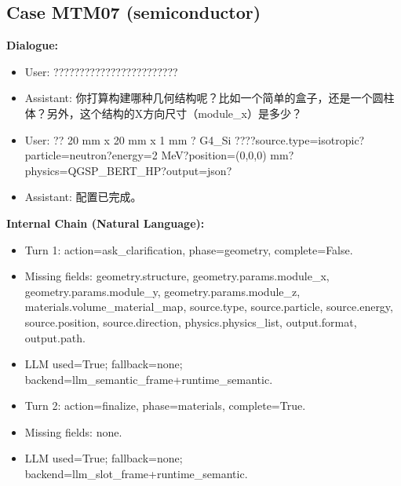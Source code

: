 \documentclass[11pt]{ctexart}
\begin{document}
\subsection{Case MTM07 (semiconductor)}
\textbf{Dialogue:}
\begin{itemize}
\item User: ????????????????????????
\item Assistant: 你打算构建哪种几何结构呢？比如一个简单的盒子，还是一个圆柱体？另外，这个结构的X方向尺寸（module\_x）是多少？
\item User: ?? 20 mm x 20 mm x 1 mm ? G4\_Si ????source.type=isotropic?particle=neutron?energy=2 MeV?position=(0,0,0) mm?physics=QGSP\_BERT\_HP?output=json?
\item Assistant: 配置已完成。
\end{itemize}
\textbf{Internal Chain (Natural Language):}
\begin{itemize}
\item Turn 1: action=ask\_clarification, phase=geometry, complete=False.
\item Missing fields: geometry.structure, geometry.params.module\_x, geometry.params.module\_y, geometry.params.module\_z, materials.volume\_material\_map, source.type, source.particle, source.energy, source.position, source.direction, physics.physics\_list, output.format, output.path.
\item LLM used=True; fallback=none; backend=llm\_semantic\_frame+runtime\_semantic.
\item Turn 2: action=finalize, phase=materials, complete=True.
\item Missing fields: none.
\item LLM used=True; fallback=none; backend=llm\_slot\_frame+runtime\_semantic.
\end{itemize}
\end{document}
